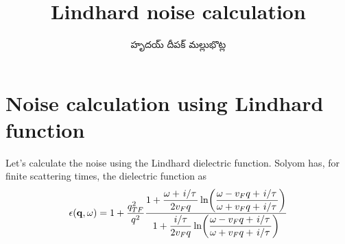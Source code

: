 \documentclass[../main.tex]{subfiles}
\title{Lindhard noise calculation}
\author{\begin{telugu}హృదయ్ దీపక్ మల్లుభొట్ల\end{telugu}}
\date{}
\begin{document}
	\graphicspath{{\main/figures/}}

	\onlyinsubfile{\maketitle}


	\section{Noise calculation using Lindhard function} \label{sec:lindc:intro}

	Let's calculate the noise using the Lindhard dielectric function.
	Solyom\supercite{SolyomV3} has, for finite scattering times, the dielectric function as
	\begin{equation}
		\epsilon(\vec{q}, \omega) = 1 + \frac{q_{TF}^2}{q^2}\frac{\displaystyle 1 + \frac{\omega + \flatfrac{i}{\tau}}{2 v_F q} \ln(\frac{\omega - v_F q + \flatfrac{i}{\tau}}{\omega + v_F q + \flatfrac{i}{\tau}})}{\displaystyle 1 + \frac{\flatfrac{i}{\tau}}{2 v_F q} \ln(\frac{\omega - v_F q + \flatfrac{i}{\tau}}{\omega + v_F q + \flatfrac{i}{\tau}})} \label{eq:lindhardsolyom}
	\end{equation}
\end{document}
